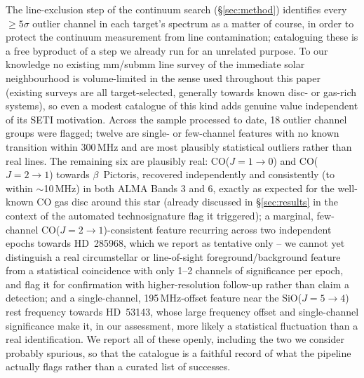 \documentclass{openjournal}
\begin{document}
The line-exclusion step of the continuum search (\S\ref{sec:method})
identifies every $\geq5\sigma$ outlier channel in each target's spectrum
as a matter of course, in order to protect the continuum measurement
from line contamination; cataloguing these is a free byproduct of a step
we already run for an unrelated purpose. To our knowledge no existing
mm/submm line survey of the immediate solar neighbourhood is
volume-limited in the sense used throughout this paper (existing surveys
are all target-selected, generally towards known disc- or gas-rich
systems), so even a modest catalogue of this kind adds genuine value
independent of its SETI motivation. Across the sample processed to date,
18 outlier channel groups were flagged; twelve are single- or
few-channel features with no known transition within 300\,MHz and are
most plausibly statistical outliers rather than real lines. The
remaining six are plausibly real: CO($J{=}1\to0$) and CO($J{=}2\to1$)
towards $\beta$~Pictoris, recovered independently and consistently (to
within $\sim$10\,MHz) in both ALMA Bands 3 and 6, exactly as expected
for the well-known CO gas disc around this star (already discussed in
\S\ref{sec:results} in the context of the automated technosignature
flag it triggered); a marginal, few-channel CO($J{=}2\to1$)-consistent
feature recurring across two independent epochs towards HD~285968, which
we report as tentative only -- we cannot yet distinguish a real
circumstellar or line-of-sight foreground/background feature from a
statistical coincidence with only 1--2 channels of significance per
epoch, and flag it for confirmation with higher-resolution follow-up
rather than claim a detection; and a single-channel, 195\,MHz-offset
feature near the SiO($J{=}5\to4$) rest frequency towards HD~53143, whose
large frequency offset and single-channel significance make it, in our
assessment, more likely a statistical fluctuation than a real
identification. We report all of these openly, including the two we
consider probably spurious, so that the catalogue is a faithful record
of what the pipeline actually flags rather than a curated list of
successes.
\end{document}
